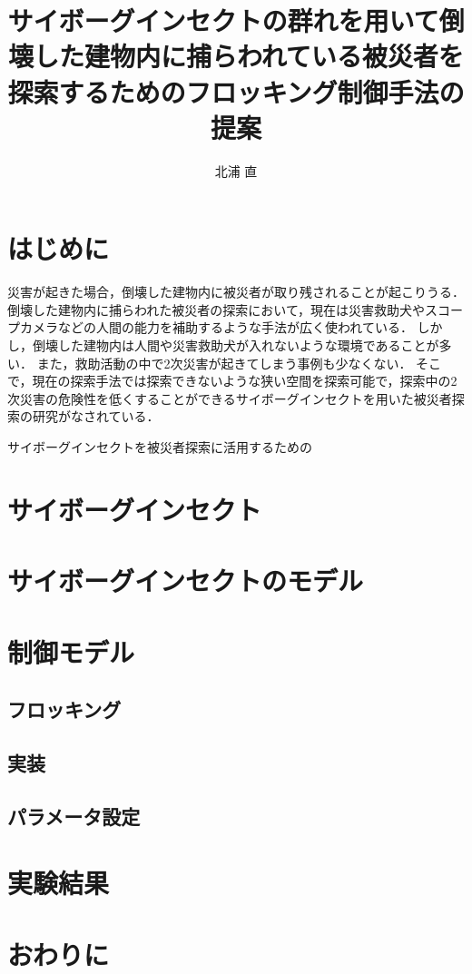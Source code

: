 \documentclass[a4paper,11pt]{jarticle}
\title{サイボーグインセクトの群れを用いて倒壊した建物内に捕らわれている被災者を探索するためのフロッキング制御手法の提案}
\author{北浦 直}
\begin{document}
	\titlepage    %
	\abstract     %
	\keyword
	\tableofcontents    %
	\section{はじめに}
	災害が起きた場合，倒壊した建物内に被災者が取り残されることが起こりうる．
	倒壊した建物内に捕らわれた被災者の探索において，現在は災害救助犬やスコープカメラなどの人間の能力を補助するような手法が広く使われている．
	しかし，倒壊した建物内は人間や災害救助犬が入れないような環境であることが多い．%
	また，救助活動の中で2次災害が起きてしまう事例も少なくない．
	そこで，現在の探索手法では探索できないような狭い空間を探索可能で，探索中の2次災害の危険性を低くすることができるサイボーグインセクトを用いた被災者探索の研究がなされている．
	
	サイボーグインセクトを被災者探索に活用するための
	\section{サイボーグインセクト}
	\section{サイボーグインセクトのモデル}
	\section{制御モデル}
	\subsection{フロッキング}
	\subsection{実装}
	\subsection{パラメータ設定}
	\section{実験結果}
	\section{おわりに}
	\begin{thebibliography}{99}
		\item 
	\end{thebibliography}
\end{document}
